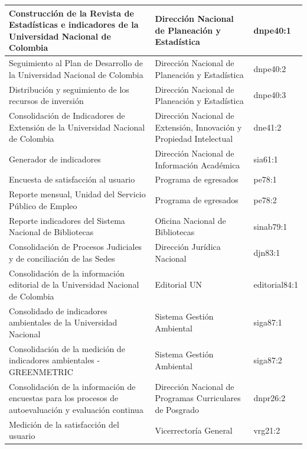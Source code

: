 \documentclass[
]{book}
\begin{document}
\begin{table}
\begin{tabular}[t]{l|l|l}
\hline
Construcción de la Revista de Estadísticas e indicadores de la Universidad Nacional de Colombia & Dirección Nacional de Planeación y Estadística & dnpe40:1\\
\hline
Seguimiento al Plan de Desarrollo de la Universidad Nacional de Colombia & Dirección Nacional de Planeación y Estadística & dnpe40:2\\
\hline
Distribución y seguimiento de los recursos de inversión & Dirección Nacional de Planeación y Estadística & dnpe40:3\\
\hline
Consolidación de Indicadores de Extensión de la Universidad Nacional de Colombia & Dirección Nacional de Extensión, Innovación y Propiedad Intelectual & dne41:2\\
\hline
Generador de indicadores & Dirección Nacional de Información Académica & sia61:1\\
\hline
Encuesta de satisfacción al usuario & Programa de egresados & pe78:1\\
\hline
Reporte mensual, Unidad del Servicio Público de Empleo & Programa de egresados & pe78:2\\
\hline
Reporte indicadores del Sistema Nacional de Bibliotecas & Oficina Nacional de Bibliotecas & sinab79:1\\
\hline
Consolidación de Procesos Judiciales y de conciliación de las Sedes & Dirección Jurídica Nacional & djn83:1\\
\hline
Consolidación de la información editorial de la Universidad Nacional de Colombia & Editorial UN & editorial84:1\\
\hline
Consolidado de indicadores ambientales de la Universidad Nacional & Sistema Gestión Ambiental & siga87:1\\
\hline
Consolidación de la medición de indicadores ambientales - GREENMETRIC & Sistema Gestión Ambiental & siga87:2\\
\hline
Consolidación de la información de encuestas para los procesos de autoevaluación y evaluación continua & Dirección Nacional de Programas Curriculares de Posgrado & dnpr26:2\\
\hline
Medición de la satisfacción del usuario & Vicerrectoría General & vrg21:2\\
\hline
\end{tabular}
\end{table}
\end{document}
